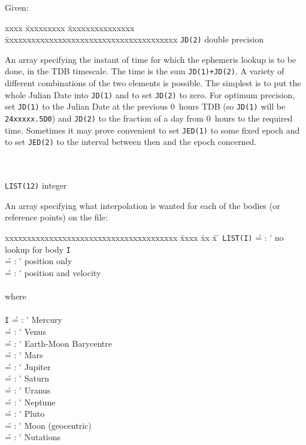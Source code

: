 Given:
\begin{tabbing}
xxxx \= xxxxxxxxx \= xxxxxxxxxxxxxxx \=
xxxxxxxxxxxxxxxxxxxxxxxxxxxxxxxxxxxxxxx \kill
\> \verb|JD(2)| \> double precision \>
             \parbox[t]{24em}{An
         array specifying the
         instant of time for which the ephemeris lookup is to be
         done, in the TDB timescale.  The time is the sum
         \verb|JD(1)+JD(2)|.  A variety of different combinations of the
         two elements is possible.  The simplest is to put the
         whole Julian Date into \verb|JD(1)|
         and to set \verb|JD(2)| to zero.
         For optimum precision, set \verb|JD(1)| to the Julian Date at
         the previous 0~hours TDB (so \verb|JD(1)| will be \verb|24xxxxx.5D0|)
         and \verb|JD(2)| to the fraction of a day from 0~hours to the
         required time.  Sometimes it may prove convenient to
         set \verb|JED(1)| to some fixed epoch and
         to set \verb|JED(2)| to the
         interval between then and the epoch concerned.} \\ \\
\> \verb|LIST(12)| \> integer \>
             \parbox[t]{24em}{An array specifying what
         interpolation is wanted for each of the bodies (or
         reference points) on the file:}
\end{tabbing}
\begin{tabbing}
xxxxxxxxxxxxxxxxxxxxxxxxxxxxxxxxxxxxxxx \= xxxx \= xx \= x \= \kill
         \> \verb|LIST(I)| \' = \>: \'\> no lookup for body \verb|I| \\
                \>    \' = \>: \'\> position only \\
                \>    \' = \>: \'\> position and velocity \\ \\
         \> where     \' \\ \\
         \> \verb|I|  \' = \>: \'\> Mercury \\
                \>    \' = \>: \'\> Venus   \\
                \>    \' = \>: \'\> Earth-Moon Barycentre \\
                \>    \' = \>: \'\> Mars    \\
                \>    \' = \>: \'\> Jupiter \\
                \>    \' = \>: \'\> Saturn  \\
                \>    \' = \>: \'\> Uranus  \\
                \>    \' = \>: \'\> Neptune \\
                \>    \' = \>: \'\> Pluto   \\
                \>    \' = \>: \'\> Moon (geocentric) \\
                \>    \' = \>: \'\> Nutations
\end{tabbing}
